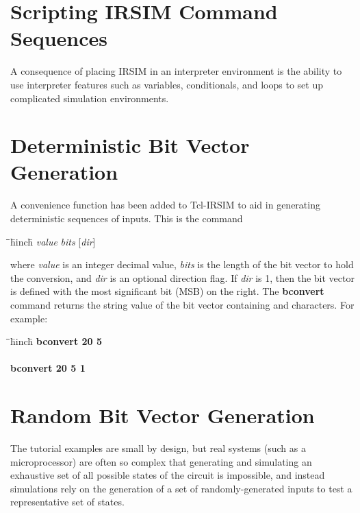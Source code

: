 \documentclass[letterpaper,twoside,12pt]{article}
\def\hinch{\hspace*{0.5in}}
\def\starti{\begin{center}\begin{tabbing}\hinch\=\hinch\=\hinch\=hinch\hinch\=\kill}
\def\endi{\end{tabbing}\end{center}}
\def\ii{\>\>\>}
\def\bstf{\bfseries\ttfamily}
\begin{document}
\section{Scripting IRSIM Command Sequences}

A consequence of placing IRSIM in an interpreter environment is
the ability to use interpreter features such as variables,
conditionals, and loops to set up complicated simulation
environments.

\section{Deterministic Bit Vector Generation}

A convenience function has been added to Tcl-IRSIM to aid in
generating deterministic sequences of inputs.  This is the
command
\starti
   \ii {\bstf bconvert} {\itshape value} {\itshape bits} [{\itshape dir}]
\endi
where {\itshape value} is an integer decimal value, {\itshape bits}
is the length of the bit vector to hold the conversion, and {\itshape
dir} is an optional direction flag.  If {\itshape dir} is 1, then the
bit vector is defined with the most significant bit (MSB) on the right.
The {\bstf bconvert} command returns the string value of the bit
vector containing {} and {} characters.  For
example:

\starti
   \ii {\itshape \%} {\bstf bconvert 20 5} \\
   \ii {\ttfamily 10100} \\
   \ii {\itshape \%} {\bstf bconvert 20 5 1} \\
   \ii {\ttfamily 00101}
\endi

\section{Random Bit Vector Generation}

The tutorial examples are small by design, but real systems (such as
a microprocessor) are often so complex that generating and simulating
an exhaustive set of all possible states of the circuit is impossible,
and instead simulations rely on the generation of a set of
randomly-generated inputs to test a representative set of states.
\end{document}
